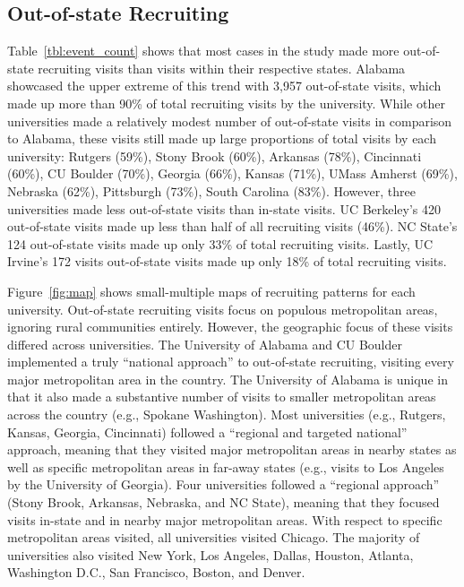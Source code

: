 \documentclass[twoside]{article}
\begin{document}
\subsection*{Out-of-state Recruiting}

Table~\ref{tbl:event_count} shows that most cases in the study made more out-of-state recruiting visits than visits within their respective states. Alabama showcased the upper extreme of this trend with 3,957 out-of-state visits, which made up more than 90\% of total recruiting visits by the university. While other universities made a relatively modest number of out-of-state visits in comparison to Alabama, these visits still made up large proportions of total visits by each university: Rutgers (59\%), Stony Brook (60\%), Arkansas (78\%), Cincinnati (60\%), CU Boulder (70\%), Georgia (66\%), Kansas (71\%), UMass Amherst (69\%), Nebraska (62\%), Pittsburgh (73\%), South Carolina (83\%). However, three universities made less out-of-state visits than in-state visits. UC Berkeley's 420 out-of-state visits made up less than half of all recruiting visits (46\%). NC State's 124 out-of-state visits made up only 33\% of total recruiting visits. Lastly, UC Irvine's 172 visits out-of-state visits made up only 18\% of total recruiting visits.

Figure~\ref{fig:map} shows small-multiple maps of recruiting patterns for each university. Out-of-state recruiting visits focus on populous metropolitan areas, ignoring rural communities entirely. However, the geographic focus of these visits differed across universities. The University of Alabama and CU Boulder implemented a truly ``national approach'' to out-of-state recruiting, visiting every major metropolitan area in the country. The University of Alabama is unique in that it also made a substantive number of visits to smaller metropolitan areas across the country (e.g., Spokane Washington). Most universities (e.g., Rutgers, Kansas, Georgia, Cincinnati) followed a ``regional and targeted national'' approach, meaning that they visited major metropolitan areas in nearby states as well as specific metropolitan areas in far-away states (e.g., visits to Los Angeles by the University of Georgia).  Four universities followed a ``regional approach'' (Stony Brook, Arkansas, Nebraska, and NC State), meaning that they focused visits in-state and in nearby major metropolitan areas.  With respect to specific metropolitan areas visited, all universities visited Chicago. The majority of universities also visited New York, Los Angeles, Dallas, Houston, Atlanta, Washington D.C., San Francisco, Boston, and Denver.
\end{document}

